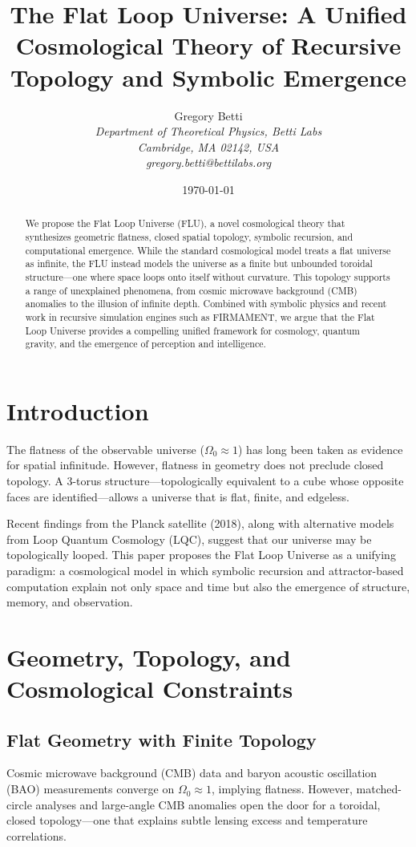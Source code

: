\documentclass[12pt]{article}
\title{\textbf{The Flat Loop Universe: A Unified Cosmological Theory of Recursive Topology and Symbolic Emergence}}
\author{Gregory Betti \\ \textit{Department of Theoretical Physics, Betti Labs} \\ \textit{Cambridge, MA 02142, USA} \\ \textit{gregory.betti@bettilabs.org}}
\date{\today}
\begin{document}
\maketitle

\begin{abstract}
We propose the Flat Loop Universe (FLU), a novel cosmological theory that synthesizes geometric flatness, closed spatial topology, symbolic recursion, and computational emergence. While the standard cosmological model treats a flat universe as infinite, the FLU instead models the universe as a finite but unbounded toroidal structure---one where space loops onto itself without curvature. This topology supports a range of unexplained phenomena, from cosmic microwave background (CMB) anomalies to the illusion of infinite depth. Combined with symbolic physics and recent work in recursive simulation engines such as FIRMAMENT, we argue that the Flat Loop Universe provides a compelling unified framework for cosmology, quantum gravity, and the emergence of perception and intelligence.
\end{abstract}

\section{Introduction}
The flatness of the observable universe ($\Omega_0 \approx 1$) has long been taken as evidence for spatial infinitude. However, flatness in geometry does not preclude closed topology. A 3-torus structure---topologically equivalent to a cube whose opposite faces are identified---allows a universe that is flat, finite, and edgeless.

Recent findings from the Planck satellite (2018), along with alternative models from Loop Quantum Cosmology (LQC), suggest that our universe may be topologically looped. This paper proposes the Flat Loop Universe as a unifying paradigm: a cosmological model in which symbolic recursion and attractor-based computation explain not only space and time but also the emergence of structure, memory, and observation.

\section{Geometry, Topology, and Cosmological Constraints}

\subsection{Flat Geometry with Finite Topology}
Cosmic microwave background (CMB) data and baryon acoustic oscillation (BAO) measurements converge on $\Omega_0 \approx 1$, implying flatness. However, matched-circle analyses and large-angle CMB anomalies open the door for a toroidal, closed topology---one that explains subtle lensing excess and temperature correlations.
\end{document}
